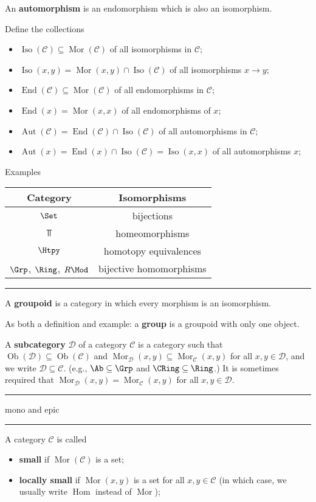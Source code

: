 \documentclass[12pt]{article}
\newcommand{\keyword}[1]{\textbf{#1}}
\newcommand{\sepline}{\rule{\textwidth}{0.4pt}}
\theoremstyle{definition}
\newcommand{\CC}{\mathcal{C}}
\newcommand{\DD}{\mathcal{D}}
\newcommand{\<}{\left\langle}
\renewcommand{\>}{\right\rangle}
\newcommand{\seq}{\subseteq}
\DeclareMathOperator{\Ob}{Ob}
\DeclareMathOperator{\Mor}{Mor}
\DeclareMathOperator{\Hom}{Hom}
\DeclareMathOperator{\Iso}{Iso}
\DeclareMathOperator{\End}{End}
\DeclareMathOperator{\Aut}{Aut}
\renewcommand{\_}[1]{{_{#1}}}
\begin{document}
An \keyword{automorphism} is an endomorphism which is also an isomorphism.

Define the collections
\begin{itemize}
    \item $\Iso(\CC) \seq \Mor(\CC)$ of all isomorphisms in $\CC$;
    \item $\Iso(x, y) = \Mor(x, y) \cap \Iso(\CC)$ of all isomorphisms $x \to y$;
    \item $\End(\CC) \seq \Mor(\CC)$ of all endomorphisms in $\CC$;
    \item $\End(x) = \Mor(x, x)$ of all endomorphisms of $x$;
    \item $\Aut(\CC) = \End(\CC) \cap \Iso(\CC)$ of all automorphisms in $\CC$;
    \item $\Aut(x) = \End(x) \cap \Iso(\CC) = \Iso(x, x)$ of all automorphisms $x$;
\end{itemize}

Examples
\begin{center}
    \begin{tabular}{c|c}
        Category & Isomorphisms \\\hline
        $\Set$ & bijections \\
        $\Top$ & homeomorphisms \\
        $\Htpy$ & homotopy equivalences \\
        $\Grp$, $\Ring$, $R\Mod$ & bijective homomorphisms
    \end{tabular}
\end{center}

\sepline

A \keyword{groupoid} is a category in which every morphism is an isomorphism.

As both a definition and example: a \keyword{group} is a groupoid with only one object.

A \keyword{subcategory} $\DD$ of a category $\CC$ is a category such that $\Ob(\DD) \seq \Ob(\CC)$ and $\Mor_\DD(x, y) \seq \Mor_\CC(x, y)$ for all $x, y \in \DD$, and we write $\DD \seq \CC$.
(e.g., $\Ab \seq \Grp$ and $\CRing \seq \Ring$.)
It is sometimes required that $\Mor_\DD(x, y) = \Mor_\CC(x, y)$ for all $x, y \in \DD$.

\sepline

mono and epic



\sepline

A category $\CC$ is called
\begin{itemize}
    \item \keyword{small} if $\Mor(\CC)$ is a set;
    \item \keyword{locally small} if $\Mor(x, y)$ is a set for all $x, y \in \CC$ (in which case, we usually write $\Hom$ instead of $\Mor$); 
\end{itemize}
\end{document}
